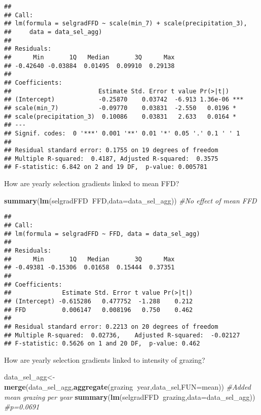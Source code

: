 \documentclass[]{article}
\newenvironment{Shaded}{\begin{snugshade}}{\end{snugshade}}
\newcommand{\KeywordTok}[1]{\textcolor[rgb]{0.13,0.29,0.53}{\textbf{#1}}}
\newcommand{\DataTypeTok}[1]{\textcolor[rgb]{0.13,0.29,0.53}{#1}}
\newcommand{\CommentTok}[1]{\textcolor[rgb]{0.56,0.35,0.01}{\textit{#1}}}
\newcommand{\OperatorTok}[1]{\textcolor[rgb]{0.81,0.36,0.00}{\textbf{#1}}}
\newcommand{\NormalTok}[1]{#1}
\begin{document}
\begin{verbatim}
## 
## Call:
## lm(formula = selgradFFD ~ scale(min_7) + scale(precipitation_3), 
##     data = data_sel_agg)
## 
## Residuals:
##      Min       1Q   Median       3Q      Max 
## -0.42640 -0.03884  0.01495  0.09910  0.29138 
## 
## Coefficients:
##                        Estimate Std. Error t value Pr(>|t|)    
## (Intercept)            -0.25870    0.03742  -6.913 1.36e-06 ***
## scale(min_7)           -0.09770    0.03831  -2.550   0.0196 *  
## scale(precipitation_3)  0.10086    0.03831   2.633   0.0164 *  
## ---
## Signif. codes:  0 '***' 0.001 '**' 0.01 '*' 0.05 '.' 0.1 ' ' 1
## 
## Residual standard error: 0.1755 on 19 degrees of freedom
## Multiple R-squared:  0.4187, Adjusted R-squared:  0.3575 
## F-statistic: 6.842 on 2 and 19 DF,  p-value: 0.005781
\end{verbatim}

How are yearly selection gradients linked to mean FFD?

\begin{Shaded}
\begin{Highlighting}[]
\KeywordTok{summary}\NormalTok{(}\KeywordTok{lm}\NormalTok{(selgradFFD}\OperatorTok{~}\NormalTok{FFD,}\DataTypeTok{data=}\NormalTok{data_sel_agg)) }\CommentTok{#No effect of mean FFD }
\end{Highlighting}
\end{Shaded}

\begin{verbatim}
## 
## Call:
## lm(formula = selgradFFD ~ FFD, data = data_sel_agg)
## 
## Residuals:
##      Min       1Q   Median       3Q      Max 
## -0.49381 -0.15306  0.01658  0.15444  0.37351 
## 
## Coefficients:
##              Estimate Std. Error t value Pr(>|t|)
## (Intercept) -0.615286   0.477752  -1.288    0.212
## FFD          0.006147   0.008196   0.750    0.462
## 
## Residual standard error: 0.2213 on 20 degrees of freedom
## Multiple R-squared:  0.02736,    Adjusted R-squared:  -0.02127 
## F-statistic: 0.5626 on 1 and 20 DF,  p-value: 0.462
\end{verbatim}

How are yearly selection gradients linked to intensity of grazing?

\begin{Shaded}
\begin{Highlighting}[]
\NormalTok{data_sel_agg<-}\KeywordTok{merge}\NormalTok{(data_sel_agg,}\KeywordTok{aggregate}\NormalTok{(grazing}\OperatorTok{~}\NormalTok{year,data_sel,}\DataTypeTok{FUN=}\NormalTok{mean))}
\CommentTok{#Added mean grazing per year}
\KeywordTok{summary}\NormalTok{(}\KeywordTok{lm}\NormalTok{(selgradFFD}\OperatorTok{~}\NormalTok{grazing,}\DataTypeTok{data=}\NormalTok{data_sel_agg)) }\CommentTok{#p=0.0691 }
\end{Highlighting}
\end{Shaded}
\end{document}
